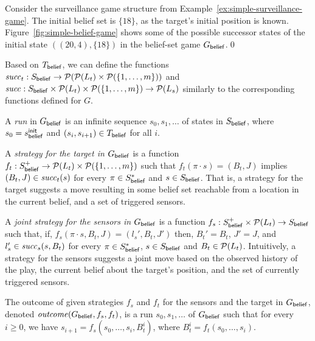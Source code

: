 \begin{example}\label{ex:simple-belief-game}
Consider the surveillance game structure from Example~\ref{ex:simple-surveillance-game}. The initial belief set is $\{18\}$, as the target's initial position is known. Figure~\ref{fig:simple-belief-game} shows some of the possible successor states of the initial state $((20,4),\{18\})$  in the belief-set game $G_{\mathsf{belief}}$.\qed
\end{example}

Based on  $T_{\mathsf{belief}}$, we can define the functions $\mathit{succ}_t : S_{\mathsf{belief}} \to \mathcal{P}(\mathcal{P}(L_t) \times  \mathcal{P}(\{1,\ldots,m\}))$ and  $\mathit{succ} : S_{\mathsf{belief}} \times \mathcal{P}(L_t) \times  \mathcal{P}(\{1,\ldots,m\}) \to \mathcal{P}(L_s)$ similarly to the corresponding functions defined for $G$. 

A \emph{run} in $G_{\mathsf{belief}}$ is an infinite sequence $s_0,s_1,\ldots$ of states in $S_{\mathsf{belief}}$, where $s_0 = s_{\mathsf{belief}}^{\mathsf{init}}$ and $(s_i,s_{i+1}) \in T_{\mathsf{belief}}$ for all $i$. 

A \emph{strategy for the target in $G_{\mathsf{belief}}$} is a function $f_t: S_{\mathsf{belief}}^+ \to \mathcal{P}(L_t) \times \mathcal{P}(\{1,\ldots,m\})$ such that $f_t(\pi\cdot s) = (B_t, J)$ implies $(B_t ,J)\in \mathit{succ}_t(s)$  for every $\pi \in S_{\mathsf{belief}}^*$ and $s \in S_{\mathsf{belief}}$. That is, a strategy for the target suggests a move resulting in some belief set reachable from a location in the current belief, and a set of triggered sensors.

A \emph{joint strategy for the sensors in $G_{\mathsf{belief}}$} is a function $f_s : S_{\mathsf{belief}}^+ \times \mathcal{P}(L_t) \to S_{\mathsf{belief}}$ such that, if, $f_s(\pi\cdot s,B_t,J) = (l_s',B_t,J')$ then, $B_t' = B_t$, $J' = J$, and $l_s' \in \mathit{succ}_s(s,B_t)$ for every $\pi \in S_{\mathsf{belief}}^*$, $s \in S_{\mathsf{belief}}$ and $B_t \in \mathcal{P}(L_t)$. Intuitively, a strategy for the sensors suggests a joint move based on the observed history of the play, the current belief about the target's position, and the set of currently triggered sensors.

The outcome of given strategies $f_s$ and $f_t$ for the sensors and the target in $G_{\mathsf{belief}}$, denoted $\mathit{outcome}(G_{\mathsf{belief}},f_s,f_t)$, is a run $s_0,s_1,\ldots$ of $G_{\mathsf{belief}}$ such that for every $i \geq 0$, we have $s_{i+1} = f_s(s_0,\ldots,s_i,B_t^i)$, where $B_t^i = f_t(s_0,\ldots,s_i)$.

